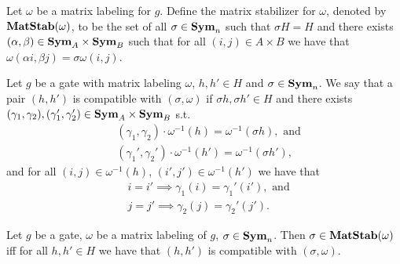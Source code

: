 \documentclass[../paper.tex]{subfiles}
\begin{document}



\begin{definition}
  Let $\omega$ be a matrix labeling for $g$. Define the matrix stabilizer for
  $\omega$, denoted by $\text{\textbf{MatStab}}(\omega)$, to be the set of all $\sigma \in
  \text{\textbf{Sym}}_n$ such that $\sigma H = H$ and there exists $(\alpha, \beta) \in \text{\textbf{Sym}}_A
  \times \text{\textbf{Sym}}_B$ such that for all $(i,j) \in A \times B$ we have that $\omega
  (\alpha i, \beta j) = \sigma \omega (i,j)$.
\end{definition}


\begin{definition}
  Let $g$ be a gate with matrix labeling $\omega$, $h,h' \in H$ and $\sigma \in
  \text{\textbf{Sym}}_n$. We say that a pair $(h, h')$ is compatible with $(\sigma, \omega)$ if
  $\sigma h, \sigma h' \in H$ and there exists $(\gamma_1, \gamma_2),
  (\gamma_1', \gamma_2') \in \text{\textbf{Sym}}_A \times \text{\textbf{Sym}}_B$ s.t.
  \begin{align*}
    &(\gamma_1, \gamma_2) \cdot \omega^{-1} (h) = \omega^{-1}(\sigma h), \text{ and} \\ 
    &(\gamma_1', \gamma_2') \cdot \omega^{-1} (h') = \omega^{-1}(\sigma h'),
  \end{align*}
  and for all $(i,j) \in \omega^{-1}(h)$, $(i',j') \in \omega^{-1}(h')$ we have
  that
  \begin{align*}
    &i =i' \implies \gamma_1(i) = \gamma_1'(i'), \text{ and} \\
    &j =j' \implies \gamma_2(j) = \gamma_2'(j').
  \end{align*}

\end{definition}

\begin{lem}
  Let $g$ be a gate, $\omega$ be a matrix labeling of $g$, $\sigma \in \text{\textbf{Sym}}_n$.
  Then $\sigma \in \text{\textbf{MatStab}}(\omega)$ iff for all $h,h' \in H$ we have that
  $(h,h')$ is compatible with $(\sigma, \omega)$.
\end{lem}
\end{document}
